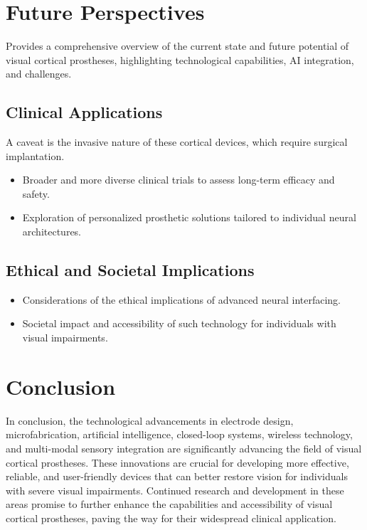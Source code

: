 \documentclass[twocolumn,10pt]{article}
\begin{document}
\section*{Future Perspectives}\label{sec:future}
Provides a comprehensive overview of the current state and future potential of
visual cortical prostheses, highlighting technological capabilities, AI
integration, and challenges.

\subsection*{Clinical Applications}
A caveat is the invasive nature of these cortical devices, which require
surgical implantation.

\begin{itemize}
      \item Broader and more diverse clinical trials to assess long-term efficacy
            and safety.
      \item Exploration of personalized prosthetic solutions tailored to
            individual neural architectures.
\end{itemize}

\subsection*{Ethical and Societal Implications}
\begin{itemize}
      \item Considerations of the ethical implications of advanced neural
            interfacing.
      \item Societal impact and accessibility of such technology for individuals
            with visual impairments.
\end{itemize}

\section*{Conclusion}\label{sec:conclusion}
In conclusion, the technological advancements in electrode design,
microfabrication, artificial intelligence, closed-loop systems, wireless
technology, and multi-modal sensory integration are significantly advancing the
field of visual cortical prostheses. These innovations are crucial for
developing more effective, reliable, and user-friendly devices that can better
restore vision for individuals with severe visual impairments. Continued
research and development in these areas promise to further enhance the
capabilities and accessibility of visual cortical prostheses, paving the way for
their widespread clinical application.

\printbibliography%
\end{document}
